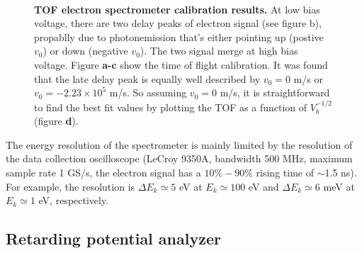 \begin{figure}[H]
	
	\vspace{-0.5\baselineskip}
	\centering
	 \\
	\vspace{-0.5\baselineskip}
	\caption[TOF electron spectrometer calibration results.]
	{{\bf TOF electron spectrometer calibration results.} At low bias voltage, there are two delay peaks of electron signal (see figure b), propablly due to photonemission that's either pointing up (postive $v_0$) or down (negative $v_0$). The two signal merge at high bias voltage. Figure {\bf a-c} show the time of flight calibration. It was found that the late delay peak is equally well described by $v_0 = 0$ m/s or $v_0 = -2.23 \times 10^5$ m/s. So assuming $v_0 = 0$ m/s, it is straightforward to find the best fit values by plotting the TOF as a function of $V_b^{-1/2}$ (figure {\bf d}).}
	\label{fig:TOFresult}
	\vspace{-0.5\baselineskip}
	
\end{figure}

The energy resolution of the spectrometer is mainly limited by the resolution of the data collection oscilloscope (LeCroy 9350A, bandwidth 500 MHz, maximum sample rate 1 GS/s, the electron signal has a $10\%-90\%$ rising time of $\sim$1.5 ns). For example, the resolution is $\Delta E_k \simeq 5$ eV at $E_k \simeq 100$ eV and $\Delta E_k \simeq 6$ meV at $E_k \simeq 1$ eV, respectively.

\subsection{Retarding potential analyzer}

